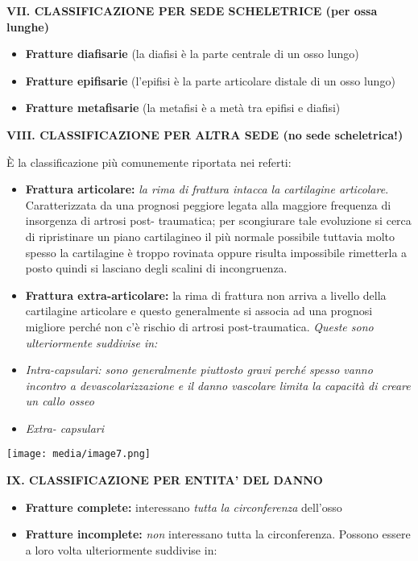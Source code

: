 \documentclass[]{article}
\begin{document}
\textbf{VII. CLASSIFICAZIONE PER SEDE SCHELETRICE (per ossa lunghe)}

\begin{itemize}
\item
  \textbf{Fratture diafisarie} (la diafisi è la parte centrale di un
  osso lungo)
\item
  \textbf{Fratture epifisarie} (l'epifisi è la parte articolare distale
  di un osso lungo)
\item
  \textbf{Fratture metafisarie} (la metafisi è a metà tra epifisi e
  diafisi)
\end{itemize}

\textbf{VIII. CLASSIFICAZIONE PER ALTRA SEDE (no sede scheletrica!) }

È la classificazione più comunemente riportata nei referti:

\begin{itemize}
\item
  \textbf{Frattura articolare:} \emph{la rima di frattura intacca la
  cartilagine articolare}. Caratterizzata da una prognosi peggiore
  legata alla maggiore frequenza di insorgenza di artrosi post-
  traumatica; per scongiurare tale evoluzione si cerca di ripristinare
  un piano cartilagineo il più normale possibile tuttavia molto spesso
  la cartilagine è troppo rovinata oppure risulta impossibile rimetterla
  a posto quindi si lasciano degli scalini di incongruenza.
\item
  \textbf{Frattura extra-articolare:} la rima di frattura non arriva a
  livello della cartilagine articolare e questo generalmente si associa
  ad una prognosi migliore perché non c'è rischio di artrosi
  post-traumatica. \emph{Queste sono ulteriormente suddivise in:}
\end{itemize}

\begin{itemize}
\item
  \emph{Intra-capsulari: sono generalmente piuttosto gravi perché spesso
  vanno incontro a devascolarizzazione e il danno vascolare limita la
  capacità di creare un callo osseo}
\item
  \emph{Extra- capsulari}
\end{itemize}

\texttt{[image: media/image7.png]}

\textbf{IX. CLASSIFICAZIONE PER ENTITA' DEL DANNO}

\begin{itemize}
\item
  \textbf{Fratture complete:} interessano \emph{tutta la circonferenza}
  dell'osso
\item
  \textbf{Fratture incomplete:} \emph{non} interessano tutta la
  circonferenza. Possono essere a loro volta ulteriormente suddivise in:
\end{itemize}
\end{document}
